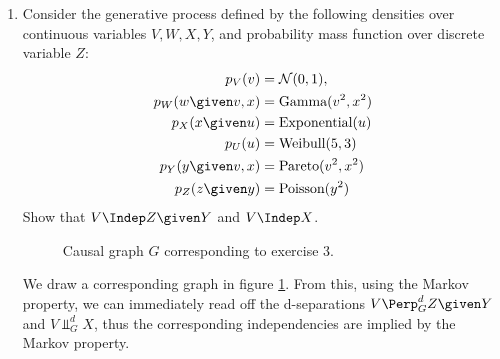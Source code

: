 \begin{enumerate}
\begin{gradedsolution}
\begin{enumerate}
      \begin{align*}
        P(Y) &= \Ncal(-3, 26) \\
        P(X|Y=y) &= \Ncal(\frac{5}{26}y + \frac{15}{26}, \frac{1}{26}).
      \end{align*}
      Thus we have defined Markov kernels such that the graph $Y \rightarrow X$ yields the same joint distribution.
      \item {} In both cases, after the intervention $\doit(X=1)$, $X$ is distributed according to a delta distribution with its mass point on $X=1$. In the original Causal Bayesian Network, after intervention do$(X=1)$, the marginal distribution of $Y$ changes from $\mathcal{N}(-3,26)$ to $\mathcal{N}(2,1)$. However, in the inverted network, Intervention on $X$ does not change the distribution of $Y$ and so it is still distributed as $\mathcal{N}(-3,26)$.
    \end{enumerate}
  \end{gradedsolution}

  \item %
  Consider the generative process defined by the following densities over continuous variables $V, W, X, Y$, and probability mass function over discrete variable $Z$:
  \begin{align*}
    p_V(v)            & = \mathcal{N}(0,1),       \\
    p_W(w\given v, x) & = \text{Gamma}(v^2, x^2)  \\
    p_X(x\given u)    & = \text{Exponential}(u)   \\
    p_U(u)            & = \text{Weibull}(5,3)     \\
    p_Y(y\given v, x) & = \text{Pareto}(v^2, x^2) \\
    p_Z(z\given y)    & = \text{Poisson}(y^2)
  \end{align*}
  Show that $V \Indep Z \given Y$ and $V \Indep X$.

  \begin{ungradedsolution}
    \begin{figure}[ht]
      \centering
      \caption{Causal graph $G$ corresponding to exercise 3.}
      \label{fig:three}
    \end{figure}
    We draw a corresponding graph in figure \ref{fig:three}. From this, using the Markov property, we can immediately read off the d-separations $V \Perp^d_G Z \given Y$ and $V \Perp^d_G X$, thus the corresponding independencies are implied by the Markov property.
  \end{ungradedsolution}



\end{enumerate}


